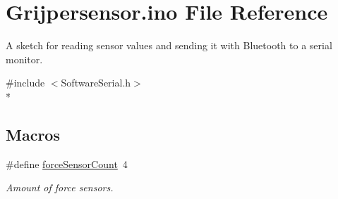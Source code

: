\hypertarget{_grijpersensor_8ino}{\section{Grijpersensor.\-ino File Reference}
\label{_grijpersensor_8ino}
}


A sketch for reading sensor values and sending it with Bluetooth to a serial monitor.  


{\ttfamily \#include $<$Software\-Serial.\-h$>$}\\*
\subsection*{Macros}
\begin{DoxyCompactItemize}
\item 
\hypertarget{_grijpersensor_8ino_af1d722b858b750ddb4d06b4e2eae635b}{\#define \hyperlink{_grijpersensor_8ino_af1d722b858b750ddb4d06b4e2eae635b}{force\-Sensor\-Count}~4}\label{_grijpersensor_8ino_af1d722b858b750ddb4d06b4e2eae635b}

\begin{DoxyCompactList}\small\item\em Amount of force sensors. \end{DoxyCompactList}\end{DoxyCompactItemize}
